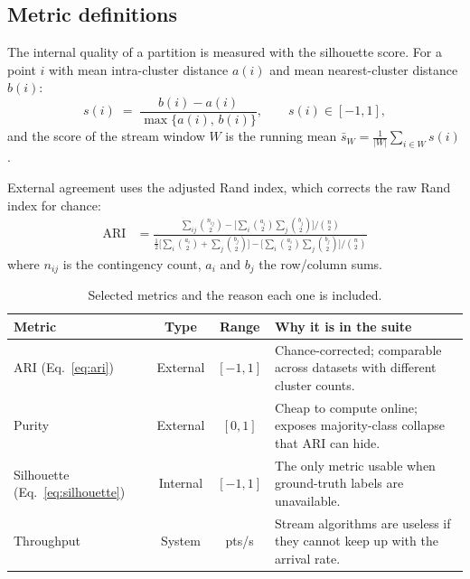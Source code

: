 \subsection{Metric definitions}

The internal quality of a partition is measured with the silhouette score.
For a point $i$ with mean intra-cluster distance $a(i)$ and mean nearest-cluster
distance $b(i)$:
\begin{equation}
  s(i) \;=\; \frac{b(i) - a(i)}{\max\{a(i),\,b(i)\}},
  \qquad s(i) \in [-1, 1],
  \label{eq:silhouette}
\end{equation}
and the score of the stream window $W$ is the running mean
$\bar{s}_W = \frac{1}{|W|}\sum_{i \in W} s(i)$.

External agreement uses the adjusted Rand index, which corrects the raw Rand
index for chance:
\begin{align}
  \mathrm{ARI}
  &= \frac{\displaystyle\sum_{ij}\binom{n_{ij}}{2}
           - \Big[\sum_i\binom{a_i}{2}\sum_j\binom{b_j}{2}\Big] \big/ \binom{n}{2}}
          {\displaystyle\frac{1}{2}\Big[\sum_i\binom{a_i}{2}+\sum_j\binom{b_j}{2}\Big]
           - \Big[\sum_i\binom{a_i}{2}\sum_j\binom{b_j}{2}\Big] \big/ \binom{n}{2}}
  \label{eq:ari}
\end{align}
where $n_{ij}$ is the contingency count, $a_i$ and $b_j$ the row/column sums.

\begin{table}[H]
\centering
\caption{Selected metrics and the reason each one is included.}
\label{tab:metrics}
\small
\begin{tabularx}{\textwidth}{@{}l c c L@{}}
\toprule
\textbf{Metric} & \textbf{Type} & \textbf{Range} & \textbf{Why it is in the suite} \\
\midrule
ARI (Eq.~\ref{eq:ari})        & External & $[-1,1]$ & Chance-corrected; comparable across datasets with different cluster counts. \\
Purity                        & External & $[0,1]$  & Cheap to compute online; exposes majority-class collapse that ARI can hide. \\
Silhouette (Eq.~\ref{eq:silhouette}) & Internal & $[-1,1]$ & The only metric usable when ground-truth labels are unavailable. \\
Throughput                    & System   & pts/s    & Stream algorithms are useless if they cannot keep up with the arrival rate. \\
\bottomrule
\end{tabularx}
\end{table}

